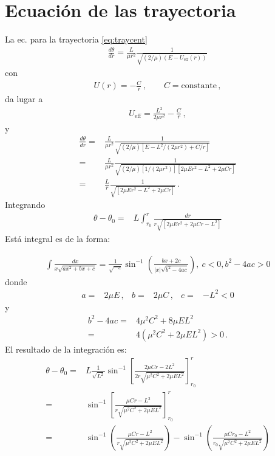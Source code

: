 \section{Ecuación de las trayectoria}
\begin{frame}
La ec. para la trayectoria \eqref{eq:traycent} 
\begin{align}
  \frac{d\theta}{dr}=\frac{L}{\mu r^2}\frac{1}{\sqrt{({2}/{\mu})\left(E-U_{\text{eff}}(r)\right)}}
\end{align}
con
\begin{align}
  U(r)=-\frac{C}{r}\,,\qquad C=\text{constante}\,,
\end{align}
da lugar a
\begin{align}
  U_{\text{eff}}=\frac{L^2}{2\mu r^2}-\frac{C}{r}\,,
\end{align}
y
\begin{align}
   \frac{d\theta}{dr}=&\frac{L}{\mu r^2}\frac{1}{\sqrt{({2}/{\mu})\left[E-L^2/(2\mu r^2)+C/r\right]}}\nonumber\\
   =&\frac{L}{\mu r^2}\frac{1}{\sqrt{({2}/{\mu})[1/(2\mu r^2)]\left[2\mu Er^2-L^2+2\mu Cr\right]}}\nonumber\\
  =&\frac{L}{r}\frac{1}{\sqrt{\left[2\mu Er^2-L^2+2\mu Cr\right]}}\,.
\end{align}
Integrando
\begin{align}
 \theta-\theta_0  =&L\int_{r_0}^r\frac{dr}{r\sqrt{\left[2\mu Er^2+2\mu Cr-L^2\right]}}
\end{align}
Está integral es de la forma:

\begin{align}
  \int\frac{dx}{x\sqrt{ax^2+bx+c}}=\frac{1}{\sqrt{-c}}\sin^{-1}\left(\frac{bx+2c}{|x|\sqrt{b^2-4ac}}\right), ~ c < 0, b^2-4ac>0
\end{align}
donde
\begin{align}
  a=&2\mu E\,, & b=&2\mu C \,,& c=&-L^2<0
\end{align}
y
\begin{align}
  b^2-4 a c=&4\mu^2 C^2+8\mu E L^2\nonumber\\
           =&4(\mu^2C^2+2\mu E L^2)>0\,.
\end{align}
El resultado de la integración es:
\begin{align}
  \theta-\theta_0=&L\frac{1}{\sqrt{L^2}}
  \sin^{-1}\left[\frac{2\mu C r-2L^2}{2r\sqrt{\mu^2C^2+2\mu E L^2}}\right]_{r_0}^r\nonumber\\
=&\sin^{-1}\left[\frac{\mu C r-L^2}{r\sqrt{\mu^2C^2+2\mu E L^2}}\right]_{r_0}^r\nonumber\\
   =&\sin^{-1}\left(\frac{\mu C r-L^2}{r\sqrt{\mu^2C^2+2\mu E L^2}}\right)-
   \sin^{-1}\left(\frac{\mu C r_0-L^2}{r_0\sqrt{\mu^2C^2+2\mu E L^2}}\right)
\end{align}


\end{frame}
